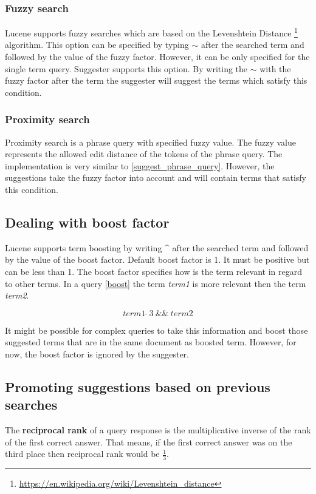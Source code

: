 \subsubsection{Fuzzy search}
Lucene supports fuzzy searches which are based on the Levenshtein Distance
\footnote{\url{https://en.wikipedia.org/wiki/Levenshtein_distance}} algorithm. This option can be specified by typing
$\sim$ after the searched term and followed by the value of the fuzzy factor. However, it can be only specified for the
single term query. Suggester supports this option. By writing the $\sim$ with the fuzzy factor after the term the
suggester will suggest the terms which satisfy this condition.

\subsubsection{Proximity search}
Proximity search is a phrase query with specified fuzzy value. The fuzzy value represents the allowed edit distance of the
tokens of the phrase query. The implementation is very similar to \ref{suggest_phrase_query}. However, the suggestions
take the fuzzy factor into account and will contain terms that satisfy this condition.

\subsection{Dealing with boost factor}
Lucene supports term boosting by writing \textbf{\^} after the searched term and followed by the value of the boost factor.
Default boost factor is 1. It must be positive but can be less than 1. The boost factor specifies how is the term relevant
in regard to other terms. In a query \ref{boost} the term \textit{term1} is more relevant then the term \textit{term2}.

\begin{equation}
\label{boost}
term1\ \hat{}\ 3\ \&\&\ term2
\end{equation}

It might be possible for complex queries to take this information and boost those suggested terms that are in the same
document as boosted term. However, for now, the boost factor is ignored by the suggester.

\subsection{Promoting suggestions based on previous searches}
The \textbf{reciprocal rank} of a query response is the multiplicative inverse of the rank of the first correct answer.
That means, if the first correct answer was on the third place then reciprocal rank would be $\frac{1}{3}$.

